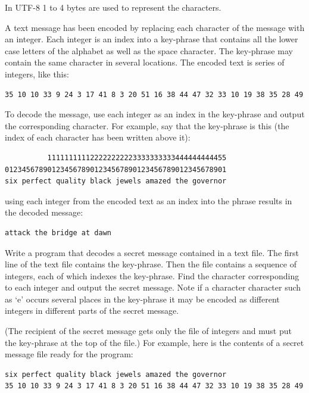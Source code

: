 In UTF-8 1 to 4 bytes are used to represent the characters.


\begin{oefening}
A text message has been encoded by replacing each character of the message with an integer.  Each integer is an index into a key-phrase that contains all the lower case letters of the alphabet as well as the space character. The key-phrase may contain the same character in several locations. The encoded text is series of integers, like this:

\begin{verbatim}
35 10 10 33 9 24 3 17 41 8 3 20 51 16 38 44 47 32 33 10 19 38 35 28 49 
\end{verbatim}

To decode the message,  use each integer as an index in the key-phrase and output the corresponding character. For example, say that the key-phrase is this (the index of each character has been written above it):

\begin{verbatim}
          111111111122222222223333333333444444444455
0123456789012345678901234567890123456789012345678901 
six perfect quality black jewels amazed the governor
\end{verbatim}

using each integer from the encoded text as an index into the phrase
 results in the decoded message:

\begin{verbatim}
attack the bridge at dawn
\end{verbatim}

Write a program that decodes a secret message contained in a text file. The first line of the text file contains the key-phrase. Then the file contains a sequence of integers, each of which indexes the key-phrase. Find the character corresponding to each integer and output the secret message. Note if a character character such as `e' occurs several places in the key-phrase it may be encoded as different integers in different parts of the secret message.

(The recipient of the secret message gets only the file of integers and must put the key-phrase at the top of the file.) For example, here is the contents of a secret message file ready for the program:

\begin{verbatim}
six perfect quality black jewels amazed the governor
35 10 10 33 9 24 3 17 41 8 3 20 51 16 38 44 47 32 33 10 19 38 35 28 49 
\end{verbatim}


\end{oefening}
